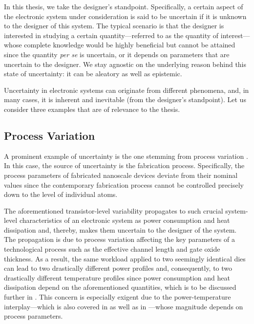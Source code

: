 In this thesis, we take the designer's standpoint. Specifically, a certain
aspect of the electronic system under consideration is said to be uncertain if
it is unknown to the designer of this system. The typical scenario is that the
designer is interested in studying a certain quantity---referred to as the
quantity of interest---whose complete knowledge would be highly beneficial but
cannot be attained since the quantity \emph{per se} is uncertain, or it depends
on parameters that are uncertain to the designer. We stay agnostic on the
underlying reason behind this state of uncertainty: it can be aleatory as well
as epistemic.

Uncertainty in electronic systems can originate from different phenomena, and,
in many cases, it is inherent and inevitable (from the designer's standpoint).
Let us consider three examples that are of relevance to the thesis.

\subsection{Process Variation}

A prominent example of uncertainty is the one stemming from process variation
\cite{chandrakasan2000, srivastava2010}. In this case, the source of uncertainty
is the fabrication process. Specifically, the process parameters of fabricated
nanoscale devices deviate from their nominal values since the contemporary
fabrication process cannot be controlled precisely down to the level of
individual atoms.

The aforementioned transistor-level variability propagates to such crucial
system-level characteristics of an electronic system as power consumption and
heat dissipation and, thereby, makes them uncertain to the designer of the
system. The propagation is due to process variation affecting the key parameters
of a technological process such as the effective channel length and gate oxide
thickness. As a result, the same workload applied to two seemingly identical
dies can lead to two drastically different power profiles and, consequently, to
two drastically different temperature profiles since power consumption and heat
dissipation depend on the aforementioned quantities, which is to be discussed
further in . This concern is especially exigent due to the
power-temperature interplay---which is also covered in  as
well as in ---whose magnitude depends on
process parameters.

